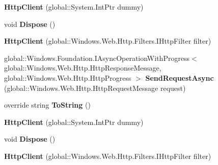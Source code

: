 \begin{DoxyCompactItemize}
{\bfseries Http\+Client} (global\+::\+System.\+Int\+Ptr dummy)
\item 
\mbox{\label{class_windows_1_1_web_1_1_http_1_1_http_client_aab5624a2c68e0b7e0a4fc8ae1ad2e18a}} 
void {\bfseries Dispose} ()
\item 
\mbox{\label{class_windows_1_1_web_1_1_http_1_1_http_client_a3031f91618b3dbcdb1053a2566067297}} 
{\bfseries Http\+Client} (global\+::\+Windows.\+Web.\+Http.\+Filters.\+I\+Http\+Filter filter)
\item 
\mbox{\label{class_windows_1_1_web_1_1_http_1_1_http_client_ad31279b417a187b8f8f2ec9bfc0149f9}} 
global\+::\+Windows.\+Foundation.\+I\+Async\+Operation\+With\+Progress$<$ global\+::\+Windows.\+Web.\+Http.\+Http\+Response\+Message, global\+::\+Windows.\+Web.\+Http.\+Http\+Progress $>$ {\bfseries Send\+Request\+Async} (global\+::\+Windows.\+Web.\+Http.\+Http\+Request\+Message request)
\item 
\mbox{\label{class_windows_1_1_web_1_1_http_1_1_http_client_a649e21fae58b67e6dcf87c4f4c7fd711}} 
override string {\bfseries To\+String} ()
\item 
\mbox{\label{class_windows_1_1_web_1_1_http_1_1_http_client_a375894a36751ce007d8632850ca5b413}} 
{\bfseries Http\+Client} (global\+::\+System.\+Int\+Ptr dummy)
\item 
\mbox{\label{class_windows_1_1_web_1_1_http_1_1_http_client_aab5624a2c68e0b7e0a4fc8ae1ad2e18a}} 
void {\bfseries Dispose} ()
\item 
\mbox{\label{class_windows_1_1_web_1_1_http_1_1_http_client_a3031f91618b3dbcdb1053a2566067297}} 
{\bfseries Http\+Client} (global\+::\+Windows.\+Web.\+Http.\+Filters.\+I\+Http\+Filter filter)
\item 
\mbox{\label{class_windows_1_1_web_1_1_http_1_1_http_client_ad31279b417a187b8f8f2ec9bfc0149f9}} 

\end{DoxyCompactItemize}
